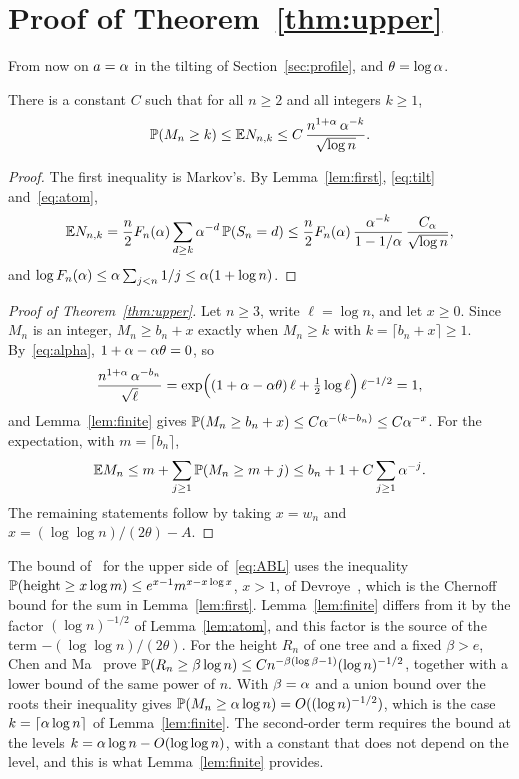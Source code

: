 \section{Proof of Theorem~\ref{thm:upper}}\label{sec:upper}

From now on $a=\alpha$ in the tilting of Section~\ref{sec:profile}, and $\theta=\log\alpha$.

\begin{lemma}\label{lem:finite}
There is a constant $C$ such that for all $n\ge2$ and all integers $k\ge1$,
\[
\mathbb{P}(M_n\ge k)\le\mathbb{E} N_{n,k}\le C\,\frac{n^{1+\alpha}\,\alpha^{-k}}{\sqrt{\log n}} .
\]
\end{lemma}

\begin{proof}
The first inequality is Markov's. By Lemma~\ref{lem:first}, \eqref{eq:tilt} and~\eqref{eq:atom},
\[
\mathbb{E} N_{n,k}=\frac n2F_n(\alpha)\sum_{d\ge k}\alpha^{-d}\,\mathbb{P}(S_n=d)
\le\frac n2F_n(\alpha)\,\frac{\alpha^{-k}}{1-1/\alpha}\,\frac{C_{\alpha}}{\sqrt{\log n}} ,
\]
and $\log F_n(\alpha)\le\alpha\sum_{j<n}1/j\le\alpha(1+\log n)$.
\end{proof}

\begin{proof}[Proof of Theorem~\ref{thm:upper}]
Let $n\ge3$, write $\ell=\log n$, and let $x\ge0$. Since $M_n$ is an integer, $M_n\ge b_n+x$ exactly when
$M_n\ge k$ with $k=\lceil b_n+x\rceil\ge1$. By~\eqref{eq:alpha}, $1+\alpha-\alpha\theta=0$, so
\[
\frac{n^{1+\alpha}\,\alpha^{-b_n}}{\sqrt{\ell}}
=\exp\Bigl((1+\alpha-\alpha\theta)\,\ell+\tfrac12\log\ell\Bigr)\,\ell^{-1/2}=1 ,
\]
and Lemma~\ref{lem:finite} gives $\mathbb{P}(M_n\ge b_n+x)\le C\alpha^{-(k-b_n)}\le C\alpha^{-x}$. For the expectation, with
$m=\lceil b_n\rceil$,
\[
\mathbb{E} M_n\le m+\sum_{j\ge1}\mathbb{P}(M_n\ge m+j)\le b_n+1+C\sum_{j\ge1}\alpha^{-j} .
\]
The remaining statements follow by taking $x=w_n$ and $x=(\log\log n)/(2\theta)-A$.
\end{proof}

\begin{remark}
The bound of~\cite{ABL} for the upper side of~\eqref{eq:ABL} uses the inequality
$\mathbb{P}(\text{height}\ge x\log m)\le e^{x-1}m^{x-x\log x}$, $x>1$, of Devroye~\cite{Devroye}, which is the Chernoff bound for
the sum in Lemma~\ref{lem:first}. Lemma~\ref{lem:finite} differs from it by the factor $(\log n)^{-1/2}$ of
Lemma~\ref{lem:atom}, and this factor is the source of the term $-(\log\log n)/(2\theta)$. For the height $R_n$ of
one tree and a fixed $\beta>e$, Chen and Ma~\cite[Proposition~3.1]{ChenMa} prove
$\mathbb{P}(R_n\ge\beta\log n)\le Cn^{-\beta(\log\beta-1)}(\log n)^{-1/2}$, together with a lower bound of the same power
of $n$. With $\beta=\alpha$ and a union bound over the roots their inequality gives
$\mathbb{P}(M_n\ge\alpha\log n)=O((\log n)^{-1/2})$, which is the case $k=\lceil\alpha\log n\rceil$ of
Lemma~\ref{lem:finite}. The second-order term requires the bound at the levels $k=\alpha\log n-O(\log\log n)$, with a
constant that does not depend on the level, and this is what Lemma~\ref{lem:finite} provides.
\end{remark}

